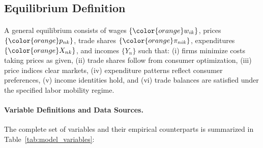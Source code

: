 \subsection{Equilibrium Definition}

\paragraph{} A general equilibrium consists of wages $\{{\color{orange}w_{ik}}\}$, prices $\{{\color{orange}p_{nk}}\}$, trade shares $\{{\color{orange}\pi_{nik}}\}$, expenditures $\{{\color{orange}X_{nk}}\}$, and incomes $\{Y_n\}$ such that: (i) firms minimize costs taking prices as given, (ii) trade shares follow from consumer optimization, (iii) price indices clear markets, (iv) expenditure patterns reflect consumer preferences, (v) income identities hold, and (vi) trade balances are satisfied under the specified labor mobility regime.

\paragraph{Variable Definitions and Data Sources.} The complete set of variables and their empirical counterparts is summarized in Table~\ref{tab:model_variables}:


